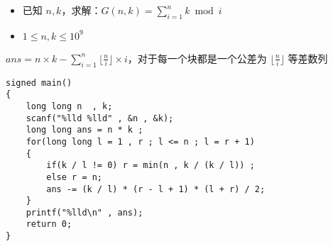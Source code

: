 \documentclass[E:/GsjzTle/main/main.tex]{subfiles}
\begin{document}
\begin{itemize}
\item
  已知 \(n,k\)，求解：\(G(n, k) = \sum_{i = 1}^n k \bmod i\)
\item
  \(1 \leq n, k \leq 10^9\)
\end{itemize}

\(ans = n \times k - \sum_{i = 1}^n\lfloor\frac{n}{i}\rfloor\times i\)，对于每一个块都是一个公差为
\(\lfloor\frac{n}{i} \rfloor\) 等差数列

\begin{lstlisting}
signed main()
{
	long long n  , k;
	scanf("%lld %lld" , &n , &k);
	long long ans = n * k ;
	for(long long l = 1 , r ; l <= n ; l = r + 1)
	{
		if(k / l != 0) r = min(n , k / (k / l)) ;
		else r = n;  
		ans -= (k / l) * (r - l + 1) * (l + r) / 2;
	}
	printf("%lld\n" , ans);
	return 0;
}
\end{lstlisting}
\end{document}
